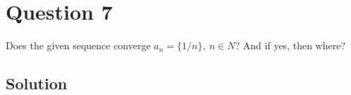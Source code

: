 \section*{Question 7}

Does the given sequence converge \( a_{n} = \{1 / n\}, \ n \in N \)?
And if yes, then where?

\subsection*{Solution}
